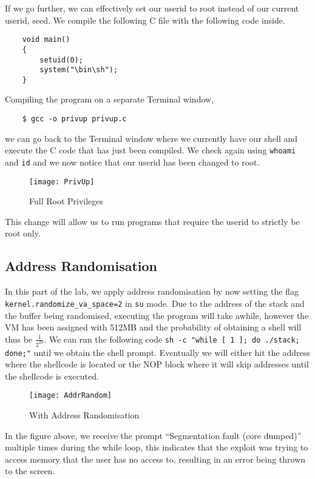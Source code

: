 \documentclass[a4paper,12pt]{article}
\begin{document}
	\noindent If we go further, we can effectively set our userid to root instead of our current userid, seed. We compile the following C file with the following code inside.\begin{verbatim}
	void main()
	{
	    setuid(0);
	    system("\bin\sh");
	}
	\end{verbatim}
	Compiling the program on a separate Terminal window,
	\begin{verbatim}
	$ gcc -o privup privup.c
	\end{verbatim}
	we can go back to the Terminal window where we currently have our shell and execute the C code that has just been compiled. We check again using \texttt{whoami} and \texttt{id} and we now notice that our userid has been changed to root.
	\begin{figure}[H]
		\centering
		\texttt{[image: PrivUp]}
		\caption{Full Root Privileges}
		\label{fig:privup}
	\end{figure}
	\noindent This change will allow us to run programs that require the userid to strictly be root only.
	\subsection{Address Randomisation}
	In this part of the lab, we apply address randomisation by now setting the flag \texttt{kernel.randomize\_va\_space=2} in \texttt{su} mode. Due to the address of the stack and the buffer being randomised, executing the program will take awhile, however the VM has been assigned with 512MB and the probability of obtaining a shell will thus be $\frac{1}{2^{29}}$. We can run the following code \texttt{sh -c "while [ 1 ]; do ./stack; done;"} until we obtain the shell prompt. Eventually we will either hit the address where the shellcode is located or the NOP block where it will skip addresses until the shellcode is executed.
	\begin{figure}[H]
		\centering
		\texttt{[image: AddrRandom]}
		\caption{With Address Randomisation}
		\label{fig:addrrandom}
	\end{figure}
	\noindent In the figure above, we receive the prompt ``Segmentation fault (core dumped)'' multiple times during the while loop, this indicates that the exploit was trying to access memory that the user has no access to, resulting in an error being thrown to the screen.
\end{document}
